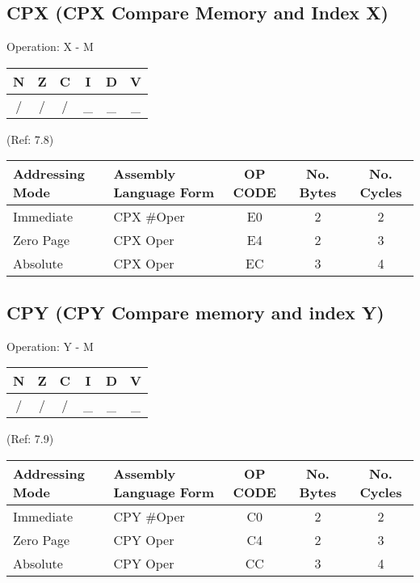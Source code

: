 \documentclass{article}
\begin{document}
  \subsection{CPX (CPX Compare Memory and Index X)}

  Operation:  X - M
  \begin{table}[H]
  \centering
  \begin{tabular}{|c c c c c c|}
  \hline
  N&Z&C&I&D&V\\
  \hline
  / & / & / & \_ & \_ & \_\\
  \hline
  \end{tabular}
  \end{table}
                                 (Ref: 7.8)
  \begin{table}[H]
  \centering
  \begin{tabular}{|l|l|c|c|c|}
  \hline
   Addressing Mode& Assembly Language Form& OP CODE &No. Bytes&No. Cycles\\
  \hline
    Immediate     &   CPX \#Oper          &    E0   &    2    &    2     \\
    Zero Page     &   CPX Oper            &    E4   &    2    &    3     \\
    Absolute      &   CPX Oper            &    EC   &    3    &    4     \\
  \hline
  \end{tabular}
  \end{table}

  \subsection{CPY (CPY Compare memory and index Y)}

  Operation:  Y - M
  \begin{table}[H]
  \centering
  \begin{tabular}{|c c c c c c|}
  \hline
  N&Z&C&I&D&V\\
  \hline
  / & / & / & \_ & \_ & \_\\
  \hline
  \end{tabular}
  \end{table}
                                 (Ref: 7.9)
  \begin{table}[H]
  \centering
  \begin{tabular}{|l|l|c|c|c|}
  \hline
   Addressing Mode& Assembly Language Form& OP CODE &No. Bytes&No. Cycles\\
  \hline
    Immediate     &   CPY \#Oper           &    C0   &    2    &    2     \\
    Zero Page     &   CPY Oper            &    C4   &    2    &    3     \\
    Absolute      &   CPY Oper            &    CC   &    3    &    4     \\
  \hline
  \end{tabular}
  \end{table}
\end{document}
